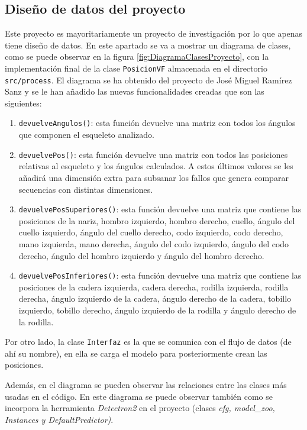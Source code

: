 \subsection{Diseño de datos del proyecto}
Este proyecto es mayoritariamente un proyecto de investigación por lo que apenas tiene diseño de datos. En este apartado se va a mostrar un diagrama de clases, como se puede observar en la figura \ref{fig:DiagramaClasesProyecto}, con la implementación final de la clase \texttt{PosicionVF} almacenada en el directorio \texttt{src/process}. El diagrama se ha obtenido del proyecto de José Miguel Ramírez Sanz y se le han añadido las nuevas funcionalidades creadas que son las siguientes:
\begin{enumerate}
    \item \texttt{devuelveAngulos()}: esta función devuelve una matriz con todos los ángulos que componen el esqueleto analizado.
    \item \texttt{devuelvePos()}: esta función devuelve una matriz con todos las posiciones relativas al esqueleto y los ángulos calculados. A estos últimos valores se les añadirá una dimensión extra para subsanar los fallos que genera comparar secuencias con distintas dimensiones. 
    \item \texttt{devuelvePosSuperiores()}: esta función devuelve una matriz que contiene las posiciones de la nariz, hombro izquierdo, hombro derecho, cuello, ángulo del cuello izquierdo, ángulo del cuello derecho, codo izquierdo, codo derecho, mano izquierda, mano derecha, ángulo del codo izquierdo, ángulo del codo derecho, ángulo del hombro izquierdo y ángulo del hombro derecho.
    \item \texttt{devuelvePosInferiores()}: esta función devuelve una matriz que contiene las posiciones de la cadera izquierda, cadera derecha, rodilla izquierda, rodilla derecha, ángulo izquierdo de la cadera, ángulo derecho de la cadera, tobillo izquierdo, tobillo derecho, ángulo izquierdo de la rodilla y ángulo derecho de la rodilla. 
\end{enumerate}

Por otro lado, la clase \texttt{Interfaz} es la que se comunica con el flujo de datos (de ahí su nombre), en ella se carga el modelo para posteriormente crean las posiciones.

Además, en el diagrama se pueden observar las relaciones entre las clases más usadas en el código. En este diagrama se puede observar también como se incorpora la herramienta \textit{Detectron2} en el proyecto (clases \emph{cfg, model\_zoo, Instances y DefaultPredictor)}.


